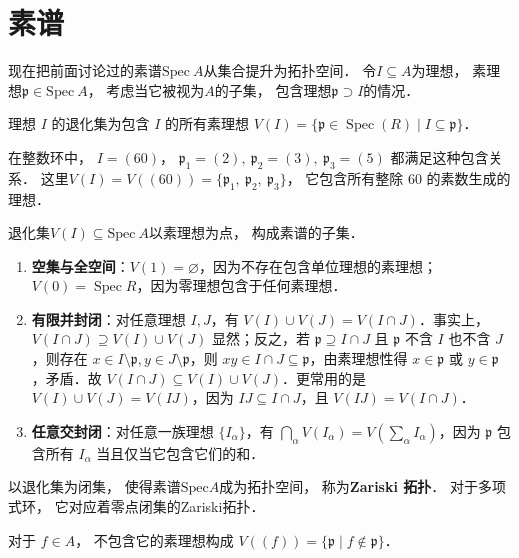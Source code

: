 \section{素谱}

现在把前面讨论过的素谱$\text{Spec} \ A$从集合提升为拓扑空间．
令$I \subseteq A$为理想，
素理想$\mathfrak p \in\text{Spec} \ A$，
考虑当它被视为$A$的子集，
包含理想$\mathfrak p \supset I$的情况．

\begin{framed}
\noindent
理想 $I$ 的退化集为包含 $I$ 的所有素理想
$ V(I) = \{ \mathfrak{p} \in \operatorname{Spec}(R) \mid I \subseteq \mathfrak{p} \} $．
\end{framed}

在整数环中，
$I = (60)$，
$\mathfrak p_1 = (2),\ \mathfrak p_2 = (3),\ \mathfrak p_3 = (5)$
都满足这种包含关系．
这里$V(I) = V((60)) = \{ \mathfrak p_1,\ \mathfrak p_2,\ \mathfrak p_3 \}$，
它包含所有整除 $60$ 的素数生成的理想．

退化集$V(I) \subseteq \text{Spec} \ A$以素理想为点，
构成素谱的子集．

\begin{enumerate}
    \item \textbf{空集与全空间}：\(V(1) = \varnothing\)，因为不存在包含单位理想的素理想；\(V(0) = \operatorname{Spec} R\)，因为零理想包含于任何素理想．
    \item \textbf{有限并封闭}：对任意理想 \(I, J\)，有 \(V(I) \cup V(J) = V(I \cap J)\)．事实上，\(V(I \cap J) \supseteq V(I) \cup V(J)\) 显然；反之，若 \(\mathfrak{p} \supseteq I \cap J\) 且 \(\mathfrak{p}\) 不含 \(I\) 也不含 \(J\)，则存在 \(x \in I \setminus \mathfrak{p}, y \in J \setminus \mathfrak{p}\)，则 \(xy \in I \cap J \subseteq \mathfrak{p}\)，由素理想性得 \(x \in \mathfrak{p}\) 或 \(y \in \mathfrak{p}\)，矛盾．故 \(V(I \cap J) \subseteq V(I) \cup V(J)\)．更常用的是 \(V(I) \cup V(J) = V(IJ)\)，因为 \(IJ \subseteq I \cap J\)，且 \(V(IJ) = V(I \cap J)\)．
    \item \textbf{任意交封闭}：对任意一族理想 \(\{I_\alpha\}\)，有 \(\bigcap_\alpha V(I_\alpha) = V(\sum_\alpha I_\alpha)\)，因为 \(\mathfrak{p}\) 包含所有 \(I_\alpha\) 当且仅当它包含它们的和．
\end{enumerate}

以退化集为闭集，
使得素谱$\text{Spec} A$成为拓扑空间，
称为\textbf{Zariski 拓扑}．
对于多项式环，
它对应着零点闭集的Zariski拓扑．

对于 $f \in A$，
不包含它的素理想构成
$V((f)) = \{ \mathfrak{p} \mid f \notin \mathfrak{p} \}$．

